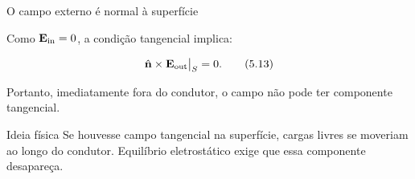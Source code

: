 \documentclass[aspectratio=169]{beamer}
\begin{document}
\begin{frame}{O campo externo é normal à superfície}

\small

Como \(\mathbf E_{\rm in}=0\), a condição tangencial implica:

\begin{eqbox}
\begin{equation}
\hat{\mathbf n}\times \mathbf E_{\rm out}\big|_S=0.
\tag{5.13}
\label{eq:campo-tangencial-zero-superficie}
\end{equation}
\end{eqbox}

Portanto, imediatamente fora do condutor, o campo não pode ter componente
tangencial.

\begin{center}
\end{center}

\begin{mybox}{Ideia física}
Se houvesse campo tangencial na superfície, cargas livres se moveriam ao longo
do condutor. Equilíbrio eletrostático exige que essa componente desapareça.
\end{mybox}

\end{frame}
\end{document}
